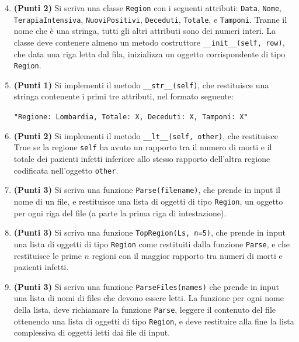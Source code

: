 \begin{enumerate}
\setcounter{enumi}{3}

\item {\bf (Punti 2)}
Si scriva una classe {\tt Region} con i seguenti attributi: {\tt Data}, {\tt Nome}, {\tt TerapiaIntensiva}, {\tt NuoviPositivi}, {\tt Deceduti}, {\tt Totale}, e  {\tt Tamponi}.
Tranne il nome che è una stringa, tutti gli altri attributi sono dei numeri interi.
La classe deve contenere almeno un metodo costruttore {\tt \_\_init\_\_(self, row)}, che data una riga letta dal fila,
inizializza un oggetto corrispondente di tipo {\tt Region}.

\item {\bf (Punti 1)} Si implementi il metodo {\tt \_\_str\_\_(self)}, che restituisce una stringa contenente i primi tre attributi, nel formato seguente:

{\tt "Regione: Lombardia, Totale: X, Deceduti: X, Tamponi: X"}


\item {\bf (Punti 2)} Si implementi il metodo {\tt \_\_lt\_\_(self, other)}, che restituisce True se la regione {\tt self} ha avuto
un rapporto tra il numero di morti e il totale dei pazienti infetti inferiore allo stesso rapporto dell'altra regione codificata
nell'oggetto {\tt other}.

\item {\bf (Punti 3)} Si scriva una funzione {\tt Parse(filename)}, che prende in input il nome di un file,
e restituisce una lista di oggetti di tipo {\tt Region}, un oggetto per ogni riga del file (a parte la prima riga di intestazione).


\item {\bf (Punti 3)} Si scriva una funzione {\tt TopRegion(Ls, n=5)}, che prende in input una lista di oggetti di tipo {\tt Region}
come restituiti dalla funzione {\tt Parse}, e che restituisce le prime $n$ regioni con il maggior rapporto tra numeri di morti e pazienti infetti.


\item {\bf (Punti 3)} Si scriva una funzione {\tt ParseFiles(names)} che prende in input una lista di nomi di files che devono
essere letti. La funzione per ogni nome della lista, deve richiamare la funzione {\tt Parse}, leggere il contenuto del file ottenendo
una lista di oggetti di tipo {\tt Region}, e deve restituire alla fine la lista complessiva di oggetti letti dai file di input.


\end{enumerate}
